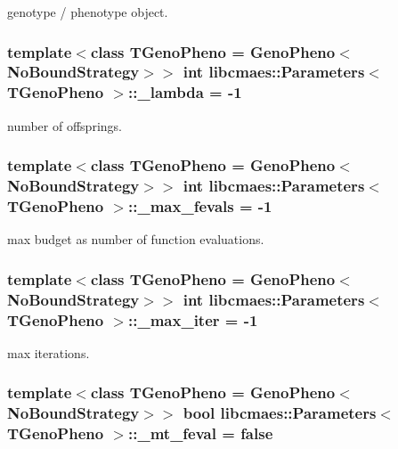 genotype / phenotype object. \hypertarget{classlibcmaes_1_1Parameters_af732f7206f23cbd6ec2bbd4e217a9a2b}{
\subsubsection[{\-\_\-lambda}]{\setlength{\rightskip}{0pt plus 5cm}template$<$class T\-Geno\-Pheno = Geno\-Pheno$<$\-No\-Bound\-Strategy$>$$>$ int {\bf libcmaes\-::\-Parameters}$<$ T\-Geno\-Pheno $>$\-::\-\_\-lambda = -\/1}}\label{classlibcmaes_1_1Parameters_af732f7206f23cbd6ec2bbd4e217a9a2b}
number of offsprings. \hypertarget{classlibcmaes_1_1Parameters_ad316488121bd51f62b28e8183d591c9e}{
\subsubsection[{\-\_\-max\-\_\-fevals}]{\setlength{\rightskip}{0pt plus 5cm}template$<$class T\-Geno\-Pheno = Geno\-Pheno$<$\-No\-Bound\-Strategy$>$$>$ int {\bf libcmaes\-::\-Parameters}$<$ T\-Geno\-Pheno $>$\-::\-\_\-max\-\_\-fevals = -\/1}}\label{classlibcmaes_1_1Parameters_ad316488121bd51f62b28e8183d591c9e}
max budget as number of function evaluations. \hypertarget{classlibcmaes_1_1Parameters_a60abfc730c5aa46e42ebd1598b59caa6}{
\subsubsection[{\-\_\-max\-\_\-iter}]{\setlength{\rightskip}{0pt plus 5cm}template$<$class T\-Geno\-Pheno = Geno\-Pheno$<$\-No\-Bound\-Strategy$>$$>$ int {\bf libcmaes\-::\-Parameters}$<$ T\-Geno\-Pheno $>$\-::\-\_\-max\-\_\-iter = -\/1}}\label{classlibcmaes_1_1Parameters_a60abfc730c5aa46e42ebd1598b59caa6}
max iterations. \hypertarget{classlibcmaes_1_1Parameters_a78a3b97b4119776b661c1be4fc283069}{
\subsubsection[{\-\_\-mt\-\_\-feval}]{\setlength{\rightskip}{0pt plus 5cm}template$<$class T\-Geno\-Pheno = Geno\-Pheno$<$\-No\-Bound\-Strategy$>$$>$ bool {\bf libcmaes\-::\-Parameters}$<$ T\-Geno\-Pheno $>$\-::\-\_\-mt\-\_\-feval = false}}\label{classlibcmaes_1_1Parameters_a78a3b97b4119776b661c1be4fc283069}
